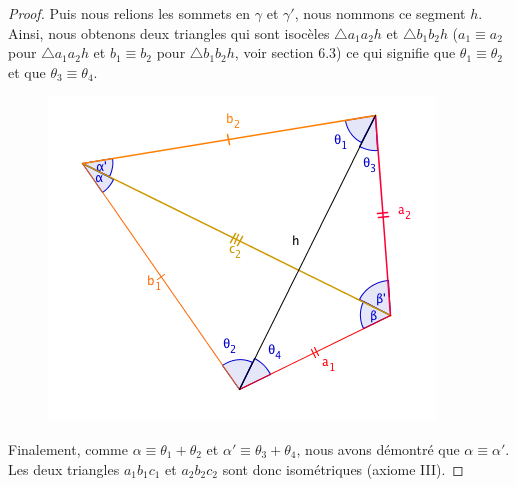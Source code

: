 \documentclass[a4paper,12pt]{article}
\begin{document}
\begin{proof}
 Puis nous relions les sommets en $\gamma$ et $\gamma'$, nous nommons ce segment $h$. Ainsi, nous obtenons deux triangles qui sont isocèles $\triangle a_1a_2h$ et $\triangle b_1b_2h$ ($a_1\equiv a_2$ pour $\triangle a_1a_2h$ et $b_1\equiv b_2$ pour $\triangle b_1b_2h$, voir section 6.3) ce qui signifie que $\theta_1 \equiv \theta_2$ et que $\theta_3 \equiv \theta_4$.
 
 
 \begin{figure}[H]
    \centering
    \includegraphics[scale=0.6]{theorems/isom3/Cas3_3.png}
\end{figure}

 
 
 Finalement, comme $\alpha \equiv \theta_1 + \theta_2$ et $\alpha' \equiv \theta_3 + \theta_4$, nous avons démontré que $\alpha \equiv \alpha'$. Les deux triangles $a_1b_1c_1$ et $a_2b_2c_2$ sont donc isométriques (axiome III).
\end{proof}
\end{document}
